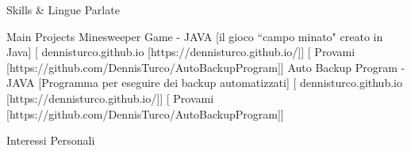\documentclass[]{llresume}
\begin{document}
\begin{mainpane}
    \begin{mainsection}{Skills \& Lingue Parlate}
    \end{mainsection}

    \begin{mainsection}{Main Projects}
        \entryGeneric
            {Minesweeper Game - JAVA}
            [il gioco ``campo minato" creato in Java]
            [\infoHomepage
                {dennisturco.github.io}
                [https://dennisturco.github.io/]]
            [\infoGithub
                {Provami}
                [https://github.com/DennisTurco/AutoBackupProgram]]
        \entryGeneric
            {Auto Backup Program - JAVA}
            [Programma per eseguire dei backup automatizzati]
            [\infoHomepage
                {dennisturco.github.io}
                [https://dennisturco.github.io/]]
            [\infoGithub
                {Provami}
                [https://github.com/DennisTurco/AutoBackupProgram]]
    \end{mainsection}

    \begin{mainsection}{Interessi Personali}
    \end{mainsection}
\end{mainpane}
\end{document}
